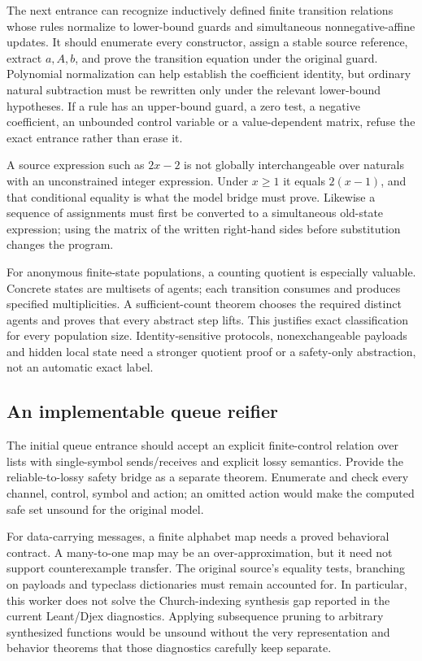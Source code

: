 \documentclass[11pt,a4paper]{article}
\theoremstyle{definition}
\begin{document}
The next entrance can recognize inductively defined finite transition
relations whose rules normalize to lower-bound guards and simultaneous
nonnegative-affine updates. It should enumerate every constructor, assign a
stable source reference, extract $a,A,b$, and prove the transition equation
under the original guard. Polynomial normalization can help establish the
coefficient identity, but ordinary natural subtraction must be rewritten only
under the relevant lower-bound hypotheses. If a rule has an upper-bound guard,
a zero test, a negative coefficient, an unbounded control variable or a
value-dependent matrix, refuse the exact entrance rather than erase it.

A source expression such as $2x-2$ is not globally interchangeable over
naturals with an unconstrained integer expression. Under $x\geq1$ it equals
$2(x-1)$, and that conditional equality is what the model bridge must prove.
Likewise a sequence of assignments must first be converted to a simultaneous
old-state expression; using the matrix of the written right-hand sides before
substitution changes the program.

For anonymous finite-state populations, a counting quotient is especially
valuable. Concrete states are multisets of agents; each transition consumes
and produces specified multiplicities. A sufficient-count theorem chooses the
required distinct agents and proves that every abstract step lifts. This
justifies exact classification for every population size. Identity-sensitive
protocols, nonexchangeable payloads and hidden local state need a stronger
quotient proof or a safety-only abstraction, not an automatic exact label.

\subsection{An implementable queue reifier}
The initial queue entrance should accept an explicit finite-control relation
over lists with single-symbol sends/receives and explicit lossy semantics.
Provide the reliable-to-lossy safety bridge as a separate theorem. Enumerate
and check every channel, control, symbol and action; an omitted action would
make the computed safe set unsound for the original model.

For data-carrying messages, a finite alphabet map needs a proved behavioral
contract. A many-to-one map may be an over-approximation, but it need not
support counterexample transfer. The original source's equality tests,
branching on payloads and typeclass dictionaries must remain accounted for.
In particular, this worker does not solve the Church-indexing synthesis gap
reported in the current Leant/Djex diagnostics. Applying subsequence pruning
to arbitrary synthesized functions would be unsound without the very
representation and behavior theorems that those diagnostics carefully keep
separate.\cite{leant,djex,indexdiag}
\end{document}
